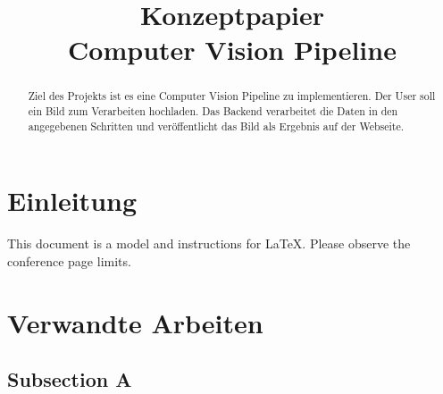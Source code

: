 \documentclass[conference]{IEEEtran}
\begin{document}
\title{Konzeptpapier
	\\Computer Vision Pipeline}

\author{
	\and

	\and
	
	\and
	
	\and
	
	\and
	
}

\maketitle

\begin{abstract}
	Ziel des Projekts ist es eine Computer Vision Pipeline zu implementieren. Der User soll ein Bild zum Verarbeiten hochladen. Das Backend verarbeitet die Daten in den angegebenen Schritten und veröffentlicht das Bild als Ergebnis auf der Webseite.
\end{abstract}


\section{Einleitung}

This document is a model and instructions for \LaTeX.
Please observe the conference page limits.




\section{Verwandte Arbeiten}

\subsection{Subsection A}
\end{document}
